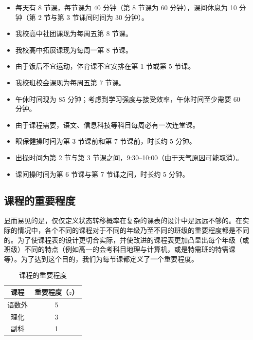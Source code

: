 \documentclass[a4paper]{article}
\begin{document}
  \begin{itemize}

  \item 每天有 8 节课，每节课为 40 分钟（第 8 节课为 60 分钟），课间休息为 10 分钟（第 2 节与第 3 节课间时间为 30 分钟）。

  \item 我校高中社团课现为每周五第 8 节课。

  \item 我校高中拓展课现为每周一第 8 节课。

  \item 由于饭后不宜运动，体育课不宜安排在第 1 节或第 5 节课。

  \item 我校班校会课现为每周五第 7 节课。

  \item 午休时间现为 85 分钟；考虑到学习强度与接受效率，午休时间至少需要 60 分钟。

  \item 由于课程需要，语文、信息科技等科目每周必有一次连堂课。

  \item 眼保健操时间为第 3 节课前和第 7 节课前，时长约 5 分钟。

  \item 出操时间为第 2 节与第 3 节课之间，9:30--10:00（由于天气原因可能取消）。

  \item 课间操时间为第 6 节课与第 7 节课之间，时长约 5 分钟。

  \end{itemize}

 \subsection{课程的重要程度}

  显而易见的是，仅仅定义状态转移概率在复杂的课表的设计中是远远不够的。在实际的情况中，各个不同的课程对于不同的年级乃至不同的班级的重要程度都是不同的。为了使课程表的设计更切合实际，并使改进的课程表更加凸显出每个年级（或班级）不同的特点（例如高一的会考科目地理与计算机，或是特需班的特需课等）。为了达到这个目的，我们为每节课都定义了一个重要程度。

  \begin{table}[H]
  \centering
  \begin{tabular}{cc}
  \toprule
  \bf 课程 & \bf 重要程度（$z$）\\
  \midrule
  语数外 & 5 \\
  理化 & 3 \\
  副科 & 1 \\
  \bottomrule
  \end{tabular}
  \caption{课程的重要程度}
  \end{table}
\end{document}
